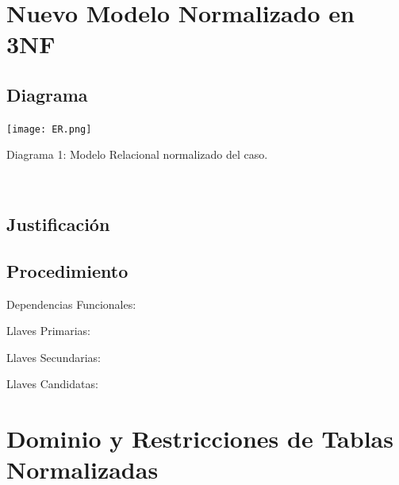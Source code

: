 \documentclass{article}
\begin{document}
       \section{Nuevo Modelo Normalizado en 3NF}

       \subsection{Diagrama}

       \texttt{[image: ER.png]}\\
       \centerline{Diagrama 1: Modelo Relacional normalizado del caso.}\\

       \subsection{Justificación}

       \subsection{Procedimiento}
       \begin{enumerate}

       \end{enumerate}

       Dependencias Funcionales:
       \begin{itemize}

       \end{itemize}

       Llaves Primarias:
       \begin{itemize}

       \end{itemize}

       Llaves Secundarias:
       \begin{itemize}

       \end{itemize}

       Llaves Candidatas:
       \begin{itemize}

       \end{itemize}

       \section{Dominio y Restricciones de Tablas Normalizadas}
\end{document}
